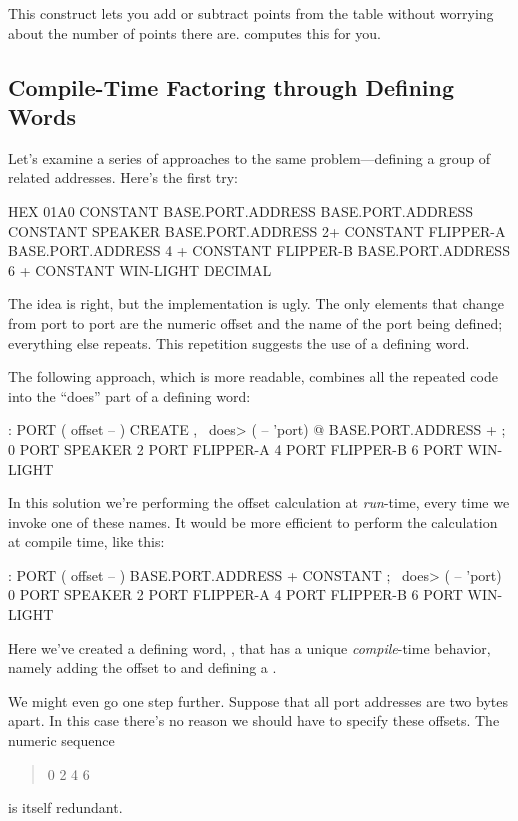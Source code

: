 This construct lets you add or subtract points from the table without
worrying about the number of points there are. \Forth{} computes this
for you.

\subsection{Compile-Time Factoring through Defining Words}%
Let's examine a series of approaches to the same problem---defining a
group of related addresses. Here's the first try:

\begin{Code}
HEX 01A0 CONSTANT BASE.PORT.ADDRESS
BASE.PORT.ADDRESS CONSTANT SPEAKER
BASE.PORT.ADDRESS 2+ CONSTANT FLIPPER-A
BASE.PORT.ADDRESS 4 + CONSTANT FLIPPER-B
BASE.PORT.ADDRESS 6 + CONSTANT WIN-LIGHT
DECIMAL
\end{Code}
The idea is right, but the implementation is ugly. The only elements
that change from port to port are the numeric offset and the name of
the port being defined; everything else repeats. This repetition
suggests the use of a defining word.

The following approach, which is more readable, combines all the
repeated code into the ``does'' part  of a defining word:

\begin{Code}
: PORT  ( offset -- )  CREATE ,
   \ does>  ( -- 'port) @ BASE.PORT.ADDRESS + ;
0 PORT SPEAKER
2 PORT FLIPPER-A
4 PORT FLIPPER-B
6 PORT WIN-LIGHT
\end{Code}
In this solution we're performing the offset calculation at
\emph{run}-time, every time we invoke one of these names. It would be
more efficient to perform the calculation at compile time, like this:

\begin{Code}
: PORT  ( offset -- )  BASE.PORT.ADDRESS + CONSTANT ;
   \ does>  ( -- 'port)
0 PORT SPEAKER
2 PORT FLIPPER-A
4 PORT FLIPPER-B
6 PORT WIN-LIGHT
\end{Code}
Here we've created a defining word, , that has a unique
\emph{compile}-time behavior, namely adding the offset to
 and defining a .

We might even go one step further. Suppose that all port addresses are
two bytes apart. In this case there's no reason we should have to
specify these offsets. The numeric sequence
\begin{quote}
0 2 4 6
\end{quote}
is itself redundant.

